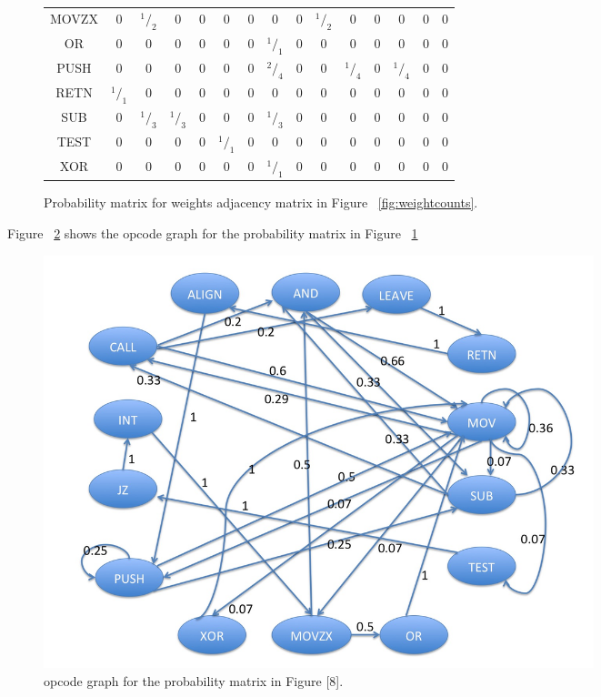 \begin{figure}[h]
\begin{tabular}{c|cccccccccccccc}
MOVZX&  0&$^1/_2$& 0&  0& 0&  0&  0&  0&  $^1/_2$&  0&  0&  0&  0& 0 \\
OR&  0&0&0&  0& 0&  0&  $^1/_1$& 0&  0&  0&  0&  0&  0& 0 \\
PUSH&0&0&0&  0& 0&  0&  $^2/_4$& 0&  0&  $^1/_4$&  0&$^1/_4$& 0&  0 \\
RETN&  $^1/_1$& 0&  0&  0& 0& 0&  0&  0&  0& 0&  0& 0&  0& 0 \\
SUB& 0&$^1/_3$& $^1/_3$& 0&  0&  0& $^1/_3$& 0& 0&  0&  0& 0&  0& 0 \\
TEST&0&0&0&  0& $^1/_1$& 0&  0&  0&  0&  0&  0& 0&  0& 0 \\
XOR& 0&0&0&  0&  0&  0&  $^1/_1$&  0&  0&  0&  0&  0&  0&  0 \\
\end{tabular}
    \caption[Probability matrix for weights adjacency matrix]{Probability matrix for weights adjacency matrix in Figure ~\ref{fig:weightcounts}.}
    \label{fig:probabilitymatrix}
\end{figure}

Figure ~\ref{fig:opcodegraph} shows the opcode graph for the probability matrix in Figure ~\ref{fig:probabilitymatrix} 

\begin{figure}[h]
  \centering
      \includegraphics[width=16cm, height=12cm]{opcodegraph.jpg}
    \caption[Opcode Graph]{opcode graph for the probability matrix in Figure [8].}
    \label{fig:opcodegraph}
\end{figure}

